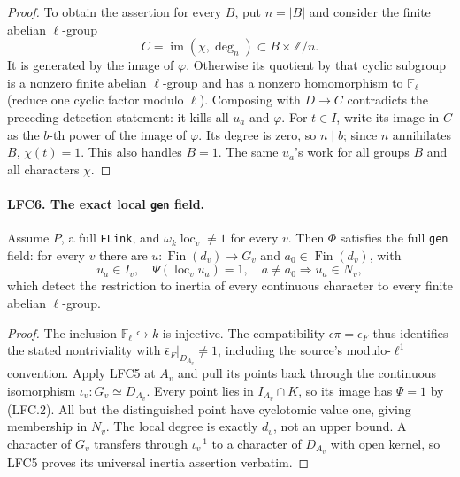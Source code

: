 \documentclass[11pt,a4paper]{article}
\numberwithin{equation}{section}
\theoremstyle{remark}\newtheorem{remark}[theorem]{Remark}
\begin{document}
\begin{proof}
To obtain the assertion for every \(B\), put \(n=|B|\) and
consider the finite abelian \(\ell\)-group
\[
             C=\operatorname{im}(\chi,\deg_n)
                       \subset B\times\mathbb Z/n.
 \]
It is generated by the image of \(\varphi\).
Otherwise its quotient by that cyclic subgroup is a nonzero
finite abelian \(\ell\)-group and has a nonzero homomorphism
to \(\mathbb F_\ell\) (reduce one cyclic factor modulo \(\ell\)).
Composing with \(D\to C\) contradicts the preceding detection
statement: it kills all \(u_a\) and \(\varphi\).
For \(t\in I\), write its image in \(C\) as the \(b\)-th
power of the image of \(\varphi\).  Its degree is zero, so
\(n\mid b\); since \(n\) annihilates \(B\), \(\chi(t)=1\).
This also handles \(B=1\).  The same \(u_a\)'s work for all
groups \(B\) and all characters \(\chi\).
\end{proof}

\paragraph{LFC6. The exact local \texttt{gen} field.}
\label{claim:LFC6}
Assume \(P\), a full \texttt{FLink}, and
\(\omega_k\operatorname{loc}_v\ne1\) for every \(v\).
Then \(\Phi\) satisfies the full \texttt{gen} field:
for every \(v\) there are \(u:\operatorname{Fin}(d_v)\to G_v\)
and \(a_0\in\operatorname{Fin}(d_v)\), with
\[
 u_a\in I_v,\quad \Psi(\operatorname{loc}_v u_a)=1,\quad
 a\ne a_0\Longrightarrow u_a\in N_v,
                                                        \tag{LFC.9}
\]
which detect the restriction to inertia of every continuous
character to every finite abelian \(\ell\)-group.

\begin{proof}
The inclusion \(\mathbb F_\ell\hookrightarrow k\) is injective.
The compatibility \(\epsilon\pi=\epsilon_F\) thus identifies
the stated nontriviality with
\(\bar\epsilon_F|_{D_{A_v}}\ne1\), including the source's
modulo-\(\ell^1\) convention.
Apply LFC5 at \(A_v\) and pull its points back through the
continuous isomorphism \(\iota_v:G_v\simeq D_{A_v}\).
Every point lies in \(I_{A_v}\cap K\), so its image has
\(\Psi=1\) by (LFC.2).  All but the distinguished point
have cyclotomic value one, giving membership in \(N_v\).
The local degree is exactly \(d_v\), not an upper bound.
A character of \(G_v\) transfers through \(\iota_v^{-1}\)
to a character of \(D_{A_v}\) with open kernel, so LFC5
proves its universal inertia assertion verbatim.
\end{proof}
\end{document}
